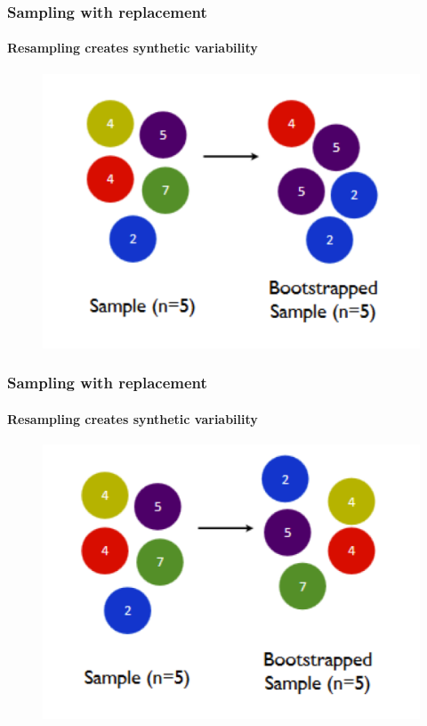\documentclass[
  shownotes,
  xcolor={svgnames},
  hyperref={colorlinks,citecolor=DarkBlue,linkcolor=andesred,urlcolor=DarkBlue}
  , aspectratio=169]{beamer}
\begin{document}
\begin{frame}[fragile]
\frametitle{Sampling with replacement}
\framesubtitle{Resampling creates synthetic variability}
\begin{figure}
  \includegraphics[scale=.3]{figures/bootstrap_cartoon2.png}
\end{figure}

\end{frame}
\begin{frame}[fragile]
\frametitle{Sampling with replacement}
\framesubtitle{Resampling creates synthetic variability}

\begin{figure}
  \includegraphics[scale=.3]{figures/bootstrap_cartoon3.png}
\end{figure}

\end{frame}
\end{document}
